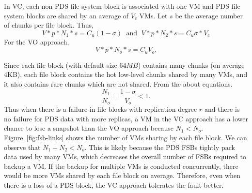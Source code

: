 In VC, each non-PDS file system block is associated with one VM
 and  PDS file system blocks are
shared by an average of $V_c$ VMs. Let $s$ be the average number of chunks per file block. Thus, 
\[
V *p*N_1 *s  = C_u (1-\sigma)\; \mbox{ and } \; 
V *p*N_2 *s  = C_u \sigma *V_c
\]
For the VO approach, 
\[
V *p*N_o *s  = C_u  V_o.
\]

Since each file block (with default size $64MB$) contains many chunks (on average 4KB),
each file block contains the hot low-level chunks shared by many VMs, and it also contains
rare chunks which are not shared.  From the about equations.
\[
\frac{N_1}{N_o}=  \frac{1-\sigma}{V_o}<1.
\] 
Thus when there is a failure in file blocks with replication degree $r$
and there is no failure for PDS data with more replicas,   a VM in
the VC approach has a lower chance to lose a snapshot than the VO approach because
$N_1<N_o$. 
Figure~\ref{fig:fsb-links} shows the number of VMs sharing by each file block.
We can observe that $N_1 +N_2 < N_o$. 
This is likely because the PDS FSBs tightly pack data used by many VMs, 
which decreases the overall number of FSBs required to backup a VM.
If  the backup for multiple VMs is conducted concurrently, there would be more
VMs shared  by each file block on average. Therefore,
even when there is a loss of a PDS block, the VC approach tolerates the fault better.




